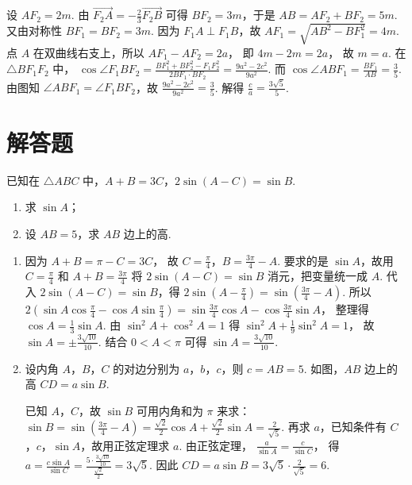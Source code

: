 \begin{solution}
设 \(AF_2=2m\). 由
\(\overrightarrow{F_2A}=-\frac23\overrightarrow{F_2B}\)
可得 \(BF_2=3m\)，于是
\(AB=AF_2+BF_2=5m\).
又由对称性 \(BF_1=BF_2=3m\). 因为 \(F_1A\perp F_1B\)，故
\(AF_1=\sqrt{AB^2-BF_1^2}=4m\).
点 \(A\) 在双曲线右支上，所以
\(AF_1-AF_2=2a\)，
即
\(4m-2m=2a\)，
故 \(m=a\).
在 \(\triangle BF_1F_2\) 中，
\(\cos\angle F_1BF_2=\frac{BF_1^2+BF_2^2-F_1F_2^2}{2BF_1\cdot BF_2} =\frac{9a^2-2c^2}{9a^2}\).
而
\(\cos\angle ABF_1=\frac{BF_1}{AB}=\frac{3}{5}\).
由图知 \(\angle ABF_1=\angle F_1BF_2\)，故
\(\frac{9a^2-2c^2}{9a^2}=\frac35\).
解得
\(\frac{c}{a}=\frac{3\sqrt5}{5}\).

\end{solution}
\section{解答题}

\begin{problem}
已知在 \(\triangle ABC\) 中，\(A+B=3C\)，\(2\sin(A-C)=\sin B\).
\begin{enumerate}
\item 求 \(\sin A\)；
\item 设 \(AB=5\)，求 \(AB\) 边上的高.
\end{enumerate}
\end{problem}

\begin{solution}
\begin{enumerate}
\item 因为
\(A+B=\pi-C=3C\)，
故
\(C=\frac{\pi}{4}\)，\(B=\frac{3\pi}{4}-A\).
要求的是 \(\sin A\)，故用 \(C=\frac{\pi}{4}\) 和 \(A+B=\frac{3\pi}{4}\) 将 \(2\sin(A-C)=\sin B\) 消元，把变量统一成 \(A\).
代入 \(2\sin(A-C)=\sin B\)，得
\(2\sin\left(A-\frac{\pi}{4}\right)=\sin\left(\frac{3\pi}{4}-A\right)\).
所以
\(2\left(\sin A\cos\frac{\pi}{4}-\cos A\sin\frac{\pi}{4}\right)=\sin\frac{3\pi}{4}\cos A-\cos\frac{3\pi}{4}\sin A\)，
整理得
\(\cos A=\frac13\sin A\).
由
\(\sin^2A+\cos^2A=1\)
得
\(\sin^2A+\frac19\sin^2A=1\)，
故
\(\sin A=\pm\frac{3\sqrt{10}}{10}\).
结合 \(0<A<\pi\) 可得
\(\sin A=\frac{3\sqrt{10}}{10}\).

\item 设内角 \(A\)，\(B\)，\(C\) 的对边分别为 \(a\)，\(b\)，\(c\)，则 \(c=AB=5\). 如图，\(AB\) 边上的高 \(CD=a\sin B\).

已知 \(A\)，\(C\)，故 \(\sin B\) 可用内角和为 \(\pi\) 来求：
\(\sin B=\sin\left(\frac{3\pi}{4}-A\right)=\frac{\sqrt2}{2}\cos A+\frac{\sqrt2}{2}\sin A=\frac{2}{\sqrt5}\).
再求 \(a\)，已知条件有 \(C\)，\(c\)，\(\sin A\)，故用正弦定理求 \(a\). 由正弦定理，
\(\frac{a}{\sin A}=\frac{c}{\sin C}\)，
得
\(a=\frac{c\sin A}{\sin C}=\frac{5\cdot \frac{3\sqrt{10}}{10}}{\frac{\sqrt2}{2}}=3\sqrt5\).
因此
\(CD=a\sin B=3\sqrt5\cdot \frac{2}{\sqrt5}=6\).

\end{enumerate}
\end{solution}

